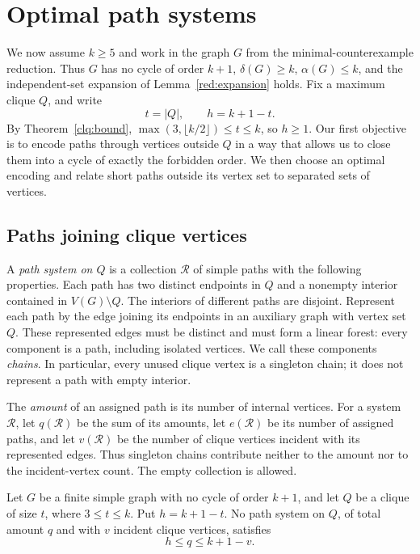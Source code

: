 \section{Optimal path systems}\label{sec:paths}

We now assume $k\geq5$ and work in the graph $G$ from the
minimal-counterexample reduction. Thus $G$ has no cycle of order $k+1$,
$\delta(G)\geq k$, $\alpha(G)\leq k$, and the independent-set expansion
of Lemma~\ref{red:expansion} holds. Fix a maximum clique $Q$, and write
\[
 t=|Q|,\qquad h=k+1-t.
\]
By Theorem~\ref{clq:bound},
$\max(3,\lfloor k/2\rfloor)\leq t\leq k$, so $h\geq1$.
Our first objective is to encode paths through vertices outside $Q$ in a
way that allows us to close them into a cycle of exactly the forbidden
order. We then choose an optimal encoding and relate short paths outside
its vertex set to separated sets of vertices.

\subsection{Paths joining clique vertices}

A \emph{path system on $Q$} is a collection $\mathcal R$ of simple paths
with the following properties. Each path has two distinct endpoints in
$Q$ and a nonempty interior contained in $V(G)\setminus Q$. The interiors
of different paths are disjoint. Represent each path by the edge joining
its endpoints in an auxiliary graph with vertex set $Q$. These represented
edges must be distinct and must form a linear forest: every component is
a path, including isolated vertices. We call these components
\emph{chains}. In particular, every unused clique vertex is a singleton
chain; it does not represent a path with empty interior.

The \emph{amount} of an assigned path is its number of internal vertices.
For a system $\mathcal R$, let $q(\mathcal R)$ be the sum of its amounts,
let $e(\mathcal R)$ be its number of assigned paths, and let
$v(\mathcal R)$ be the number of clique vertices incident with its
represented edges. Thus singleton chains contribute neither to the amount
nor to the incident-vertex count. The empty collection is allowed.

\begin{lemma}\label{path:interval}
Let $G$ be a finite simple graph with no cycle of order $k+1$, and let
$Q$ be a clique of size $t$, where $3\leq t\leq k$.
Put $h=k+1-t$. No path system on $Q$, of total amount $q$ and with $v$
incident clique vertices, satisfies
\begin{equation}\label{path:forbidden-interval}
 h\leq q\leq k+1-v.
\end{equation}
\end{lemma}

